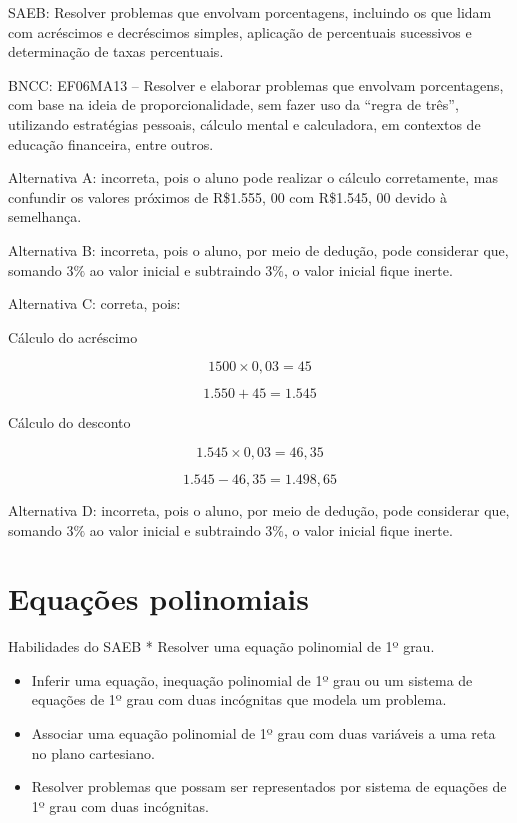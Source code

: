 SAEB: Resolver problemas que envolvam porcentagens, incluindo os que
lidam com acréscimos e decréscimos simples, aplicação de percentuais
sucessivos e determinação de taxas percentuais.

BNCC: EF06MA13 -- Resolver e elaborar problemas que envolvam
porcentagens, com base na ideia de proporcionalidade, sem fazer uso da
``regra de três'', utilizando estratégias pessoais, cálculo mental e
calculadora, em contextos de educação financeira, entre outros.

Alternativa A: incorreta, pois o aluno pode realizar o cálculo
corretamente, mas confundir os valores próximos de R\$1.555, $00$ com
R\$1.545, $00$ devido à semelhança.

Alternativa B: incorreta, pois o aluno, por meio de dedução, pode
considerar que, somando $3\%$ ao valor inicial e subtraindo $3\%$, o valor
inicial fique inerte.

Alternativa C: correta, pois:

Cálculo do acréscimo

$$1500\times 0,03 = 45$$

$$1.550 + 45 = 1.545$$

Cálculo do desconto

$$1.545\times 0,03 = 46,35$$

$$1.545 - 46,35 = 1.498,65$$

Alternativa D: incorreta, pois o aluno, por meio de dedução, pode
considerar que, somando $3\%$ ao valor inicial e subtraindo $3\%$, o valor
inicial fique inerte.

\chapter{Equações polinomiais}

Habilidades do SAEB * Resolver uma equação polinomial de 1º grau.

\begin{itemize}
\item
  Inferir uma equação, inequação polinomial de 1º grau ou um sistema de
  equações de 1º grau com duas incógnitas que modela um problema.
\item
  Associar uma equação polinomial de 1º grau com duas variáveis a uma
  reta no plano cartesiano.
\item
  Resolver problemas que possam ser representados por sistema de
  equações de 1º grau com duas incógnitas.
\end{itemize}



